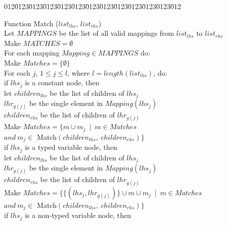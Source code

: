 \begin{tabbing}
012\=0123\=0123\=0123\=0123\=0123\=0123\=0123\=0123\=0123\=0123\=0123\=012\kill

\> Function Match ($list_{lhs}$, $list_{rhs}$) \\
\>\> Let $MAPPINGS$ be the list of all valid mappings from $list_{lhs}$ to 
	$list_{rhs}$ \\

\>\> Make $MATCHES=\emptyset$ \\

\>\> For each mapping $Mapping\in MAPPINGS$ do: \\

\>\>\> Make $Matches=\{\emptyset \}$ \\

\>\>\> For each $j$, $1 \leq j \leq l$, where $l=length(list_{lhs})$, do: \\

\>\>\>\> if $lhs_j$ is a constant node, then \\

\>\>\>\>\> let \>$children_{lhs}$ be the list of children of $lhs_j$ \\
\>\>\>\>\>     \>$lhr_{g(j)}$ be the single element in $Mapping(lhs_j)$ \\
\>\>\>\>\>     \>$children_{rhs}$ be the list of children of $lhr_{g(j)}$ \\

\>\>\>\>\> Make $Matches=\{m\cup m_j\ \mid\  m\in Matches$ \\
\>\>\>\>\>\>\>\>\> $and\ m_j\in$ Match$(children_{lhs},\ children_{rhs})\}$ \\ 

\>\>\>\> if $lhs_j$ is a typed variable node, then \\

\>\>\>\>\> let \>$children_{lhs}$ be the list of children of $lhs_j$ \\
\>\>\>\>\>     \>$lhr_{g(j)}$ be the single element in $Mapping(lhs_j)$ \\
\>\>\>\>\>     \>$children_{rhs}$ be the list of children of $lhr_{g(j)}$ \\

\>\>\>\>\> Make $Matches=\{\{(lhs_j,lhr_{g(j)})\}\cup
	m\cup m_j\ \mid\  m\in Matches$ \\
\>\>\>\>\>\>\>\>\> $and\ m_j\in$ Match$(children_{lhs},\ children_{rhs})\}$ \\ 

\>\>\>\> if $lhs_j$ is a non-typed variable node, then \\


\end{tabbing}

